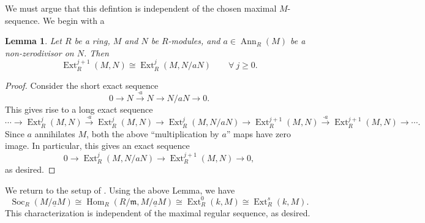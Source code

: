 \documentclass[10pt]{article}
\theoremstyle{thmstyle}
\newtheorem{lemma}[theorem]{Lemma}
\theoremstyle{defstyle}
\newcommand{\Ann}{\operatorname{Ann}}
\newcommand{\Hom}{\operatorname{Hom}}
\newcommand{\frakm}{\mathfrak{m}} %
\renewcommand{\ge}{\geqslant}
\newcommand{\Ext}{\operatorname{Ext}}
\newcommand{\Soc}{\operatorname{Soc}}
\newcommand{\ul}[1]{\underline{#1}}
\begin{document}
We must argue that this defintion is independent of the chosen maximal $M$-sequence. We begin with a 
\begin{lemma}
    Let $R$ be a ring, $M$ and $N$ be $R$-modules, and $a\in\Ann_R(M)$ be a non-zerodivisor on $N$. Then 
    \begin{equation*}
        \Ext^{j + 1}_R(M, N)\cong\Ext^j_R(M, N/aN)\qquad\forall~j\ge 0.
    \end{equation*}
\end{lemma}
\begin{proof}
    Consider the short exact sequence 
    \begin{equation*}
        0\to N\xrightarrow{\cdot a} N\to N/aN\to 0.
    \end{equation*}
    This gives rise to a long exact sequence 
    \begin{equation*}
        \cdots\to\Ext^j_R(M, N)\xrightarrow{\cdot a}\Ext^j_R(M, N)\to\Ext^j_R(M, N/aN)\to\Ext^{j + 1}_R(M, N)\xrightarrow{\cdot a}\Ext^{j + 1}_R(M, N)\to\cdots.
    \end{equation*}
    Since $a$ annihilates $M$, both the above ``multiplication by $a$'' maps have zero image. In particular, this gives an exact sequence 
    \begin{equation*}
        0\to\Ext^j_R(M, N/aN)\to\Ext^{j + 1}_R(M, N)\to 0,
    \end{equation*}
    as desired.
\end{proof}

We return to the setup of . Using the above Lemma, we have 
\begin{equation*}
    \Soc_R(M/\ul aM)\cong\Hom_R(R/\frakm, M/\ul a M)\cong\Ext^0_R(k, M)\cong\Ext^s_R(k, M).
\end{equation*}
This characterization is independent of the maximal regular sequence, as desired.
\end{document}
